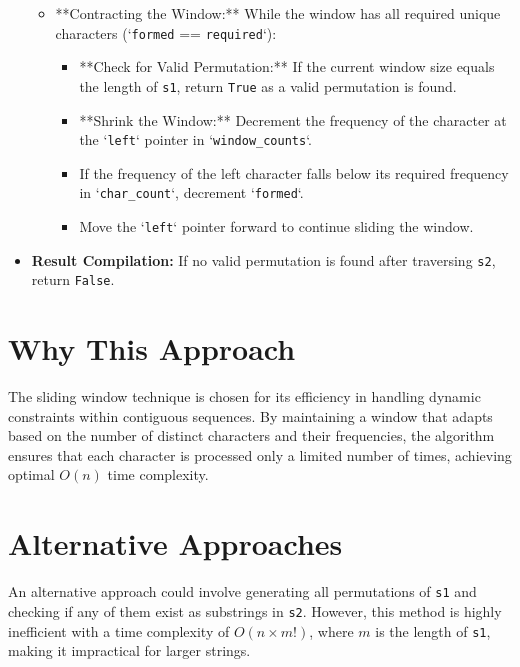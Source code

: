 \begin{itemize}
\begin{itemize}
        \item **Contracting the Window:** While the window has all required unique characters (`\texttt{formed} == \texttt{required}`):
            \begin{itemize}
                \item **Check for Valid Permutation:** If the current window size equals the length of \texttt{s1}, return \texttt{True} as a valid permutation is found.
                \item **Shrink the Window:** Decrement the frequency of the character at the `\texttt{left}` pointer in `\texttt{window\_counts}`.
                \item If the frequency of the left character falls below its required frequency in `\texttt{char\_count}`, decrement `\texttt{formed}`.
                \item Move the `\texttt{left}` pointer forward to continue sliding the window.
            \end{itemize}
    \end{itemize}
    
    \item \textbf{Result Compilation:} If no valid permutation is found after traversing \texttt{s2}, return \texttt{False}.
\end{itemize}

\section*{Why This Approach}

The sliding window technique is chosen for its efficiency in handling dynamic constraints within contiguous sequences. By maintaining a window that adapts based on the number of distinct characters and their frequencies, the algorithm ensures that each character is processed only a limited number of times, achieving optimal \(O(n)\) time complexity.

\section*{Alternative Approaches}

An alternative approach could involve generating all permutations of \texttt{s1} and checking if any of them exist as substrings in \texttt{s2}. However, this method is highly inefficient with a time complexity of \(O(n \times m!)\), where \(m\) is the length of \texttt{s1}, making it impractical for larger strings.

